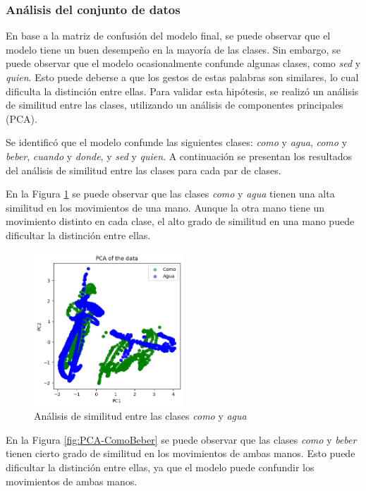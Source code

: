 \subsubsection{Análisis del conjunto de datos}

En base a la matriz de confusión del modelo final, se puede observar que el modelo tiene un buen desempeño en la mayoría de las clases.
Sin embargo, se puede observar que el modelo ocasionalmente confunde algunas clases, como \textit{sed} y \textit{quien}.
Esto puede deberse a que los gestos de estas palabras son similares, lo cual dificulta la distinción entre ellas.
Para validar esta hipótesis, se realizó un análisis de similitud entre las clases, utilizando un análisis de componentes principales (PCA).

Se identificó que el modelo confunde las siguientes clases: \textit{como} y \textit{agua}, \textit{como} y \textit{beber}, \textit{cuando} y \textit{donde}, y \textit{sed} y \textit{quien}.
A continuación se presentan los resultados del análisis de similitud entre las clases para cada par de clases.

En la Figura \ref{fig:PCA-ComoAgua} se puede observar que las clases \textit{como} y \textit{agua} tienen una alta similitud en los movimientos de una mano.
Aunque la otra mano tiene un movimiento distinto en cada clase, el alto grado de similitud en una mano puede dificultar la distinción entre ellas.

\begin{figure}[H]
    \centering
    \includegraphics[width=0.5\textwidth]{figuras/PCA-ComoAgua.png}
    \caption{Análisis de similitud entre las clases \textit{como} y \textit{agua}}
    \label{fig:PCA-ComoAgua}
\end{figure}

En la Figura \ref{fig:PCA-ComoBeber} se puede observar que las clases \textit{como} y \textit{beber} tienen cierto grado de similitud en los movimientos de ambas manos.
Esto puede dificultar la distinción entre ellas, ya que el modelo puede confundir los movimientos de ambas manos.

